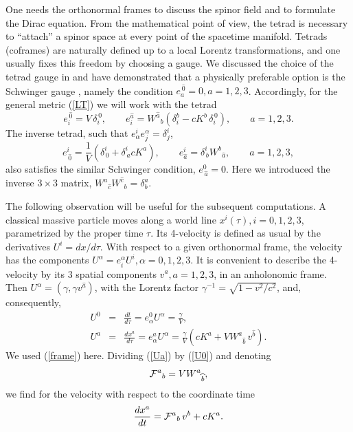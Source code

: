 \documentclass[preprint,showpacs,preprintnumbers,eqsecnum,amsmath,amssymb]{revtex4-1}
\begin{document}
One needs the orthonormal frames to discuss the spinor field and to
formulate the Dirac equation. From the mathematical point of view, the tetrad is
necessary to ``attach'' a spinor space at every point of the spacetime manifold.
Tetrads (coframes) are naturally defined up to a local Lorentz transformations,
and one usually fixes this freedom by choosing a gauge. We discussed the choice
of the tetrad gauge in \cite{OST} and have demonstrated that a physically preferable
option is the Schwinger gauge \cite{Schwinger,dirac}, namely the  condition
$e_a^{\,\widehat{0}} =0, a=1,2,3$. Accordingly, for the general metric (\ref{LT}) we will
work with the tetrad
\begin{equation}\label{coframe}
e_i^{\,\widehat{0}} = V\,\delta^{\,0}_i,\qquad e_i^{\widehat{a}} =
W^{\widehat a}{}_b\left(\delta^b_i - cK^b\,\delta^{\,0}_i\right),\qquad a=1,2,3.
\end{equation}
The inverse tetrad, such that $e^i_\alpha e^\alpha_j = \delta^i_j$,
\begin{equation}\label{frame}
e_{\,\widehat{0}}^i = {\frac 1V}\left(\delta_{\,0}^i +
\delta_{\,a}^icK^a\right), \qquad e^i_{\widehat{a}} =
\delta_{\,b}^iW^b{}_{\widehat a},\qquad a=1,2,3,
\end{equation}
also satisfies the similar Schwinger condition, $e^0_{\,\widehat{a}} = 0$. Here we
introduced the inverse $3\times 3$ matrix, $W^a{}_{\widehat c}W^{\widehat c}{}_b = \delta_b^a$.

The following observation will be useful for the subsequent computations. A classical
massive particle moves along a world line $x^i(\tau), i=0,1,2,3$, parametrized by
the proper time $\tau$. Its 4-velocity is defined as usual by the derivatives
$U^i = dx/d\tau$. With respect to a given orthonormal frame, the velocity has the
components $U^\alpha = e^\alpha_iU^i, \alpha = 0,1,2,3$. It is convenient to describe
the 4-velocity by its 3 spatial components $v^{\widehat a}, a=1,2,3$, in an anholonomic
frame. Then $U^\alpha = (\gamma, \gamma v^{\widehat a})$, with the Lorentz factor
$\gamma^{-1} = \sqrt{1 - v^2/c^2}$, and, consequently,
\begin{eqnarray}\label{U0}
U^0 &=& {\frac {dt}{d\tau}} = e^0_\alpha U^\alpha = {\frac \gamma V},\\
U^a &=& {\frac {dx^a}{d\tau}} = e^a_\alpha U^\alpha = {\frac \gamma V}\left(
cK^a + VW^a{}_{\widehat b}\,v^{\widehat b}\right).\label{Ua}
\end{eqnarray}
We used (\ref{frame}) here. Dividing (\ref{Ua}) by (\ref{U0}) and denoting
$${\cal F}^a{}_b = VW^a{}_{\widehat b},$$ we find for the velocity with respect to the
coordinate time
\begin{equation}
{\frac {dx^a}{dt}} = {\cal F}^a{}_b\,v^b + cK^a.\label{dtv}
\end{equation}
\end{document}
